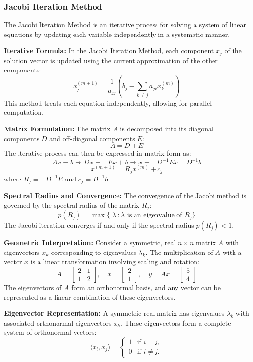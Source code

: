 \documentclass[unicode,11pt,a4paper,oneside,numbers=endperiod,openany]{scrartcl}
\begin{document}
          \subsubsection{Jacobi Iteration Method}
The Jacobi Iteration Method is an iterative process for solving a system of linear equations by updating each variable independently in a systematic manner.

\textbf{Iterative Formula:}
In the Jacobi Iteration Method, each component \( x_j \) of the solution vector is updated using the current approximation of the other components:
\[
 x_j^{(m+1)} = \frac{1}{a_{jj}} \left( b_j - \sum_{k \neq j} a_{jk} x_k^{(m)} \right)
\]
This method treats each equation independently, allowing for parallel computation.

\textbf{Matrix Formulation:}
The matrix \( A \) is decomposed into its diagonal components \( D \) and off-diagonal components \( E \):
\[
 A = D + E
\]
The iterative process can then be expressed in matrix form as:
\[
 Ax = b \Rightarrow Dx = -Ex + b \Rightarrow x = -D^{-1}Ex + D^{-1}b
\]
\[
 x^{(m+1)} = R_j x^{(m)} + c_j
\]
where \( R_j = -D^{-1}E \) and \( c_j = D^{-1}b \).

\textbf{Spectral Radius and Convergence:}
The convergence of the Jacobi method is governed by the spectral radius of the matrix \( R_j \):
\[
 p(R_j) = \max \{ |\lambda| : \lambda \text{ is an eigenvalue of } R_j \}
\]
The Jacobi iteration converges if and only if the spectral radius \( p(R_j) < 1 \).

\textbf{Geometric Interpretation:}
Consider a symmetric, real \( n \times n \) matrix \( A \) with eigenvectors \( x_k \) corresponding to eigenvalues \( \lambda_k \). The multiplication of \( A \) with a vector \( x \) is a linear transformation involving scaling and rotation:
\[
 A = \begin{bmatrix}
 2 & 1 \\
 1 & 2
 \end{bmatrix}, \quad
 x = \begin{bmatrix}
 2 \\
 1
 \end{bmatrix}, \quad
 y = Ax = \begin{bmatrix}
 5 \\
 4
 \end{bmatrix}
\]
The eigenvectors of \( A \) form an orthonormal basis, and any vector can be represented as a linear combination of these eigenvectors.

\textbf{Eigenvector Representation:}
A symmetric real matrix has eigenvalues \( \lambda_k \) with associated orthonormal eigenvectors \( x_k \). These eigenvectors form a complete system of orthonormal vectors:
\[
 \langle x_i, x_j \rangle =
 \begin{cases}
 1 & \text{if } i = j, \\
 0 & \text{if } i \neq j.
 \end{cases}
\]
\end{document}

